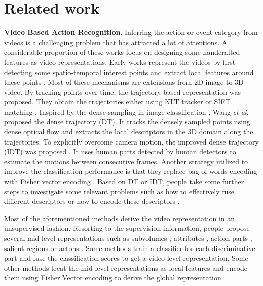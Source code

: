 \documentclass[journal]{IEEEtran}
\begin{document}
\section{Related work} \label{related work}
\noindent \textbf{Video Based Action Recognition}. Inferring the action or event category from videos is a challenging problem that has attracted a lot of attentions. A considerable proportion of these works focus on designing some handcrafted features as video representations. Early works represent the videos by first detecting some spatio-temporal interest points and extract local features around these points \cite{4587756, 5206779, DBLP:conf/bmvc/KlaserMS08, Laptev03space-timeinterest, Scovanner:2007}. Most of these mechanisms are extensions from 2D image to 3D video. By tracking points over time, the trajectory based representation was proposed. They obtain the trajectories either using KLT tracker \cite{Lucas:1981} or SIFT matching \cite{5206721}. Inspired by the dense sampling in image classification \cite{1467486}, Wang \textit{et al.} \cite{wang:2011} proposed the dense trajectory (DT). It tracks the densely sampled points using dense optical flow and extracts the local descriptors in the 3D domain along the trajectories. To explicitly overcome camera motion, the improved dense trajectory (IDT) was proposed \cite{Wang2013}. It uses human parts detected by human detectors to estimate the motions between consecutive frames. Another strategy utilized to improve the classification performance is that they replace bag-of-words encoding with Fisher vector encoding \cite{Perronnin:2010}. Based on DT or IDT, people take some further steps to investigate some relevant problems such as how to effectively fuse different descriptors \cite{6909477} or how to encode these descriptors \cite{peng14}.

Most of the aforementioned methods derive the video representation in an unsupervised fashion. Resorting to the supervision information,
people propose several mid-level representations such as subvolumes \cite{peng:stack}, attributes \cite{NIPS2014_5565}, action parts \cite{DBLP:conf/mm/LiangLC13}, salient regions \cite{6751447} or actons \cite{6751554}. Some methods train a classifier for each discriminative part and fuse the classification scores to get a video-level representation. Some other methods treat the mid-level representations as local features and encode them using Fisher Vector encoding to derive the global representation.
\end{document}
